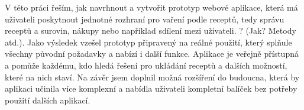 
V této práci řeším, jak navrhnout a vytvořit prototyp webové aplikace, která má uživateli poskytnout jednotné rozhraní
pro vaření podle receptů, tedy správu receptů a surovin, nákupy nebo například sdílení mezi uživateli. ? (Jak? Metody atd.).
Jako výsledek vzešel prototyp připravený na reálné použití, který splňule všechny původní požadavky a nabízí i další funkce.
Aplikace je veřejně přístupná a pomůže každému, kdo hledá řešení pro ukládání receptů a dalších možností, které na nich staví.
Na závěr jsem doplnil možná rozšíření do budoucna, která by aplikaci učinila více komplexní a nabídla uživateli kompletní
balíček bez potřeby použití dalších aplikací.

